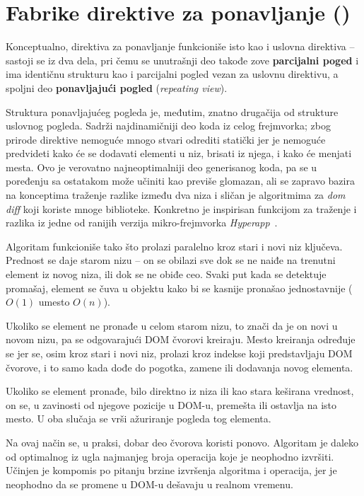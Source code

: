 \section{Fabrike direktive za ponavljanje ()}
\label{sec:fabrike-direktive-za-ponavljanje}

Konceptualno, direktiva za ponavljanje funkcioniše isto kao i uslovna direktiva -- sastoji se iz dva dela, pri čemu se unutrašnji deo takođe zove \textbf{parcijalni poged} i ima identičnu strukturu kao i parcijalni pogled vezan za uslovnu direktivu, a spoljni deo \textbf{ponavljajući pogled} (\textsl{repeating view}).

Struktura ponavljajućeg pogleda je, međutim, znatno drugačija od strukture uslovnog pogleda.
Sadrži najdinamičniji deo koda iz celog frejmvorka; zbog prirode direktive nemoguće mnogo stvari odrediti statički jer je nemoguće predvideti kako će se dodavati elementi u niz, brisati iz njega, i kako će menjati mesta.
Ovo je verovatno najneoptimalniji deo generisanog koda, pa se u poređenju sa ostatakom može učiniti kao previše glomazan, ali se zapravo bazira na konceptima traženje razlike između dva niza i sličan je algoritmima za \textit{dom diff} koji koriste mnoge biblioteke.
Konkretno je inspirisan funkcijom za traženje i  razlika iz jedne od ranijih verzija mikro-frejmvorka \textit{Hyperapp}~\cite{hyperapp:patch}.

Algoritam funkcioniše tako što prolazi paralelno kroz stari i novi niz ključeva.
Prednost se daje starom nizu -- on se obilazi sve dok se ne naiđe na trenutni element iz novog niza, ili dok se ne obiđe ceo.
Svaki put kada se detektuje promašaj, element se čuva u objektu kako bi se kasnije pronašao jednostavnije ($O(1)$ umesto $O(n)$).

Ukoliko se element ne pronađe u celom starom nizu, to znači da je on novi u novom nizu, pa se odgovarajući DOM čvorovi kreiraju.
Mesto kreiranja određuje se jer se, osim kroz stari i novi niz, prolazi kroz indekse koji predstavljaju DOM čvorove, i to samo kada dođe do pogotka, zamene ili dodavanja novog elementa.

Ukoliko se element pronađe, bilo direktno iz niza ili kao stara keširana vrednost, on se, u zavinosti od njegove pozicije u DOM-u, premešta ili ostavlja na isto mesto.
U oba slučaja se vrši ažuriranje pogleda tog elementa.

Na ovaj način se, u praksi, dobar deo čvorova koristi ponovo.
Algoritam je daleko od optimalnog iz ugla najmanjeg broja operacija koje je neophodno izvršiti.
Učinjen je kompomis po pitanju brzine izvršenja algoritma i operacija, jer je neophodno da se promene u DOM-u dešavaju u realnom vremenu.

